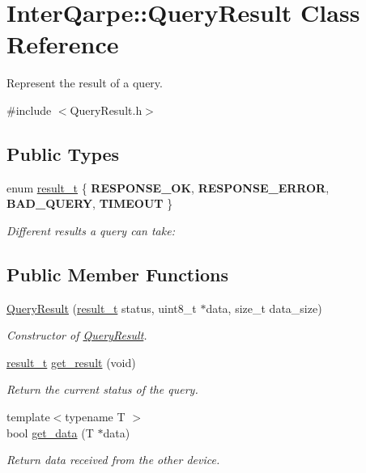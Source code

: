 \hypertarget{classInterQarpe_1_1QueryResult}{\section{Inter\+Qarpe\+:\+:Query\+Result Class Reference}
\label{classInterQarpe_1_1QueryResult}
}


Represent the result of a query.  




{\ttfamily \#include $<$Query\+Result.\+h$>$}

\subsection*{Public Types}
\begin{DoxyCompactItemize}
\item 
enum \hyperlink{classInterQarpe_1_1QueryResult_ad265093e5dea69f229df989d4e18cbb4}{result\+\_\+t} \{ {\bfseries R\+E\+S\+P\+O\+N\+S\+E\+\_\+\+O\+K}, 
{\bfseries R\+E\+S\+P\+O\+N\+S\+E\+\_\+\+E\+R\+R\+O\+R}, 
{\bfseries B\+A\+D\+\_\+\+Q\+U\+E\+R\+Y}, 
{\bfseries T\+I\+M\+E\+O\+U\+T}
 \}
\begin{DoxyCompactList}\small\item\em Different results a query can take\+: \end{DoxyCompactList}\end{DoxyCompactItemize}
\subsection*{Public Member Functions}
\begin{DoxyCompactItemize}
\item 
\hyperlink{classInterQarpe_1_1QueryResult_aeaa273884f3d8494f3451ef1da3afcba}{Query\+Result} (\hyperlink{classInterQarpe_1_1QueryResult_ad265093e5dea69f229df989d4e18cbb4}{result\+\_\+t} status, uint8\+\_\+t $\ast$data, size\+\_\+t data\+\_\+size)
\begin{DoxyCompactList}\small\item\em Constructor of \hyperlink{classInterQarpe_1_1QueryResult}{Query\+Result}. \end{DoxyCompactList}\item 
\hyperlink{classInterQarpe_1_1QueryResult_ad265093e5dea69f229df989d4e18cbb4}{result\+\_\+t} \hyperlink{classInterQarpe_1_1QueryResult_a08d4addcab59886e2e76f1028fe3ff9b}{get\+\_\+result} (void)
\begin{DoxyCompactList}\small\item\em Return the current status of the query. \end{DoxyCompactList}\item 
{\footnotesize template$<$typename T $>$ }\\bool \hyperlink{classInterQarpe_1_1QueryResult_a2a128d20e11bf7118844c73ec2035c76}{get\+\_\+data} (T $\ast$data)
\begin{DoxyCompactList}\small\item\em Return data received from the other device. \end{DoxyCompactList}\end{DoxyCompactItemize}



